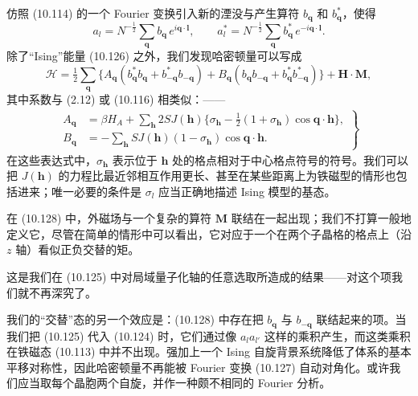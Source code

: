 仿照 (10.114) 的一个 Fourier 变换引入新的湮没与产生算符 $b_{\mathbf{q}}$ 和 $b_{\mathbf{q}}^*$，使得
\begin{equation*}
a_l = N^{-\frac{1}{2}} \sum_{\mathbf{q}} b_{\mathbf{q}}\, e^{i\mathbf{q}\cdot\mathbf{l}}, \qquad a_l^* = N^{-\frac{1}{2}} \sum_{\mathbf{q}} b_{\mathbf{q}}^*\, e^{-i\mathbf{q}\cdot\mathbf{l}}. \tag{10.127}
\end{equation*}
除了“Ising”能量 (10.126) 之外，我们发现哈密顿量可以写成
\begin{equation*}
\mathcal{H} = \tfrac{1}{2} \sum_{\mathbf{q}} \bigl\{ A_{\mathbf{q}} (b_{\mathbf{q}}^* b_{\mathbf{q}} + b_{-\mathbf{q}}^* b_{-\mathbf{q}}) + B_{\mathbf{q}} (b_{\mathbf{q}} b_{-\mathbf{q}} + b_{\mathbf{q}}^* b_{-\mathbf{q}}^*) \bigr\} + \mathbf{H}\cdot\mathbf{M}, \tag{10.128}
\end{equation*}
其中系数与 (2.12) 或 (10.116) 相类似：——
\begin{align*}
\left.
\begin{aligned}
A_{\mathbf{q}} &= \beta H_A + \sum_{\mathbf{h}} 2S J(\mathbf{h}) \bigl\{ \sigma_{\mathbf{h}} - \tfrac{1}{2}(1 + \sigma_{\mathbf{h}})\cos\mathbf{q}\cdot\mathbf{h} \bigr\}, \\
B_{\mathbf{q}} &= -\sum_{\mathbf{h}} S J(\mathbf{h})(1 - \sigma_{\mathbf{h}})\cos\mathbf{q}\cdot\mathbf{h}.
\end{aligned}
\right\} \tag{10.129}
\end{align*}
在这些表达式中，$\sigma_{\mathbf{h}}$ 表示位于 $\mathbf{h}$ 处的格点相对于中心格点符号的符号。我们可以把 $J(\mathbf{h})$ 的力程比最近邻相互作用更长、甚至在某些距离上为铁磁型的情形也包括进来；唯一必要的条件是 $\sigma_l$ 应当正确地描述 Ising 模型的基态。

在 (10.128) 中，外磁场与一个复杂的算符 $\mathbf{M}$ 联结在一起出现；我们不打算一般地定义它，尽管在简单的情形中可以看出，它对应于一个在两个子晶格的格点上（沿 $z$ 轴）看似正负交替的矩。

这是我们在 (10.125) 中对局域量子化轴的任意选取所造成的结果——对这个项我们就不再深究了。

我们的“交替”态的另一个效应是：(10.128) 中存在把 $b_{\mathbf{q}}$ 与 $b_{-\mathbf{q}}$ 联结起来的项。当我们把 (10.125) 代入 (10.124) 时，它们通过像 $a_l a_{l'}$ 这样的乘积产生，而这类乘积在铁磁态 (10.113) 中并不出现。强加上一个 Ising 自旋背景系统降低了体系的基本平移对称性，因此哈密顿量不再能被 Fourier 变换 (10.127) 自动对角化。或许我们应当取每个晶胞两个自旋，并作一种颇不相同的 Fourier 分析。


